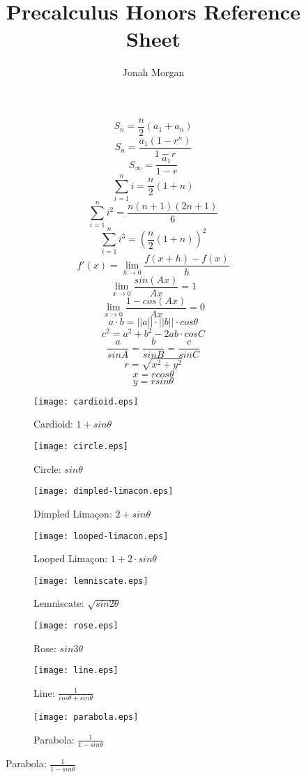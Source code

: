\documentclass{article}
\begin{document}
\vspace*{\fill}
\begin{minipage}{\textwidth}
\title{Precalculus Honors Reference Sheet}
\author{Jonah Morgan}
\maketitle
\begin{multicols}{5}
\[
S_n = \frac{n}2(a_1 + a_n)
\]
\[
S_n = \frac{a_1(1 - r^n)}{1 - r}
\]
\[
S_\infty = \frac{a_1}{1 - r}
\]
\columnbreak
\[
\sum^n_{i = 1} i = \frac{n}2(1 + n)
\]
\[
\sum^n_{i = 1} i^2 = \frac{n(n + 1)(2n + 1)}6
\]
\[
\sum^n_{i = 1} i^3 = (\frac{n}2(1 + n))^2
\]
\columnbreak
\[
f'(x) = \lim_{h \to 0} \frac{f(x + h) - f(x)}h
\]
\[
\lim_{x \to 0} \frac{sin(Ax)}{Ax} = 1
\]
\[
\lim_{x \to 0} \frac{1 - cos(Ax)}{Ax} = 0
\]
\columnbreak
\[
a \cdot b = ||a|| \cdot ||b|| \cdot cos \theta
\]
\[
c^2 = a^2 + b^2 -2ab \cdot cos C
\]
\[
\frac{a}{sin A} = \frac{b}{sin B} = \frac{c}{sin C}
\]
\columnbreak
\[
r = \sqrt{x^2 + y^2}
\]
\[
x = r cos \theta
\]
\[
y = r sin \theta
\]
\end{multicols}
\end{minipage}
\begin{figure}[h]
\begin{subfigure}{.2\textwidth}
\caption{Cardioid: $1 + sin \theta$}
\texttt{[image: cardioid.eps]}
\end{subfigure}
\hfill
\begin{subfigure}{.2\textwidth}
\caption{Circle: $sin \theta$}
\texttt{[image: circle.eps]}
\end{subfigure}
\hfill
\begin{subfigure}{.2\textwidth}
\caption{Dimpled Limaçon: $2 + sin \theta$}
\texttt{[image: dimpled-limacon.eps]}
\end{subfigure}
\hfill
\begin{subfigure}{.2\textwidth}
\caption{Looped Limaçon: $1 + 2 \cdot sin \theta$}
\texttt{[image: looped-limacon.eps]}
\end{subfigure}
\hfill
\begin{subfigure}{.2\textwidth}
\caption{Lemniscate: $\sqrt{sin 2\theta}$}
\texttt{[image: lemniscate.eps]}
\end{subfigure}
\hfill
\begin{subfigure}{.2\textwidth}
\caption{Rose: $sin 3\theta$}
\texttt{[image: rose.eps]}
\end{subfigure}
\hfill
\begin{subfigure}{.2\textwidth}
\caption{Line: $\frac{1}{cos \theta + sin \theta}$}
\texttt{[image: line.eps]}
\end{subfigure}
\hfill
\begin{subfigure}{.2\textwidth}
\caption{Parabola: $\frac{1}{1 - sin \theta}$}
\texttt{[image: parabola.eps]}
\end{subfigure}
\end{figure}
\end{document}
